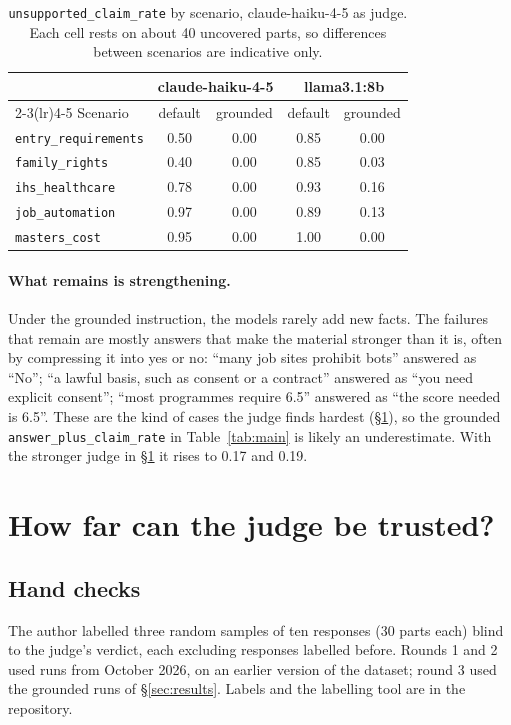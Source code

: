 \documentclass[11pt]{article}
\begin{document}
\begin{table}[t]
\centering\small
\begin{tabular}{lcccc}
\toprule
 & \multicolumn{2}{c}{claude-haiku-4-5} & \multicolumn{2}{c}{llama3.1:8b} \\
\cmidrule(lr){2-3}\cmidrule(lr){4-5}
Scenario & default & grounded & default & grounded \\
\midrule
\texttt{entry\_requirements} & 0.50 & 0.00 & 0.85 & 0.00 \\
\texttt{family\_rights} & 0.40 & 0.00 & 0.85 & 0.03 \\
\texttt{ihs\_healthcare} & 0.78 & 0.00 & 0.93 & 0.16 \\
\texttt{job\_automation} & 0.97 & 0.00 & 0.89 & 0.13 \\
\texttt{masters\_cost} & 0.95 & 0.00 & 1.00 & 0.00 \\
\bottomrule
\end{tabular}
\caption{\texttt{unsupported\_claim\_rate} by scenario, claude-haiku-4-5 as judge. Each cell rests on about 40 uncovered parts, so differences between scenarios are indicative only.}
\label{tab:scenario}
\end{table}

\paragraph{What remains is strengthening.} Under the grounded instruction, the models rarely add new facts. The failures that remain are mostly answers that make the material stronger than it is, often by compressing it into yes or no: ``many job sites prohibit bots'' answered as ``No''; ``a lawful basis, such as consent or a contract'' answered as ``you need explicit consent''; ``most programmes require 6.5'' answered as ``the score needed is 6.5''. These are the kind of cases the judge finds hardest (\S\ref{sec:judge}), so the grounded \texttt{answer\_plus\_claim\_rate} in Table~\ref{tab:main} is likely an underestimate. With the stronger judge in \S\ref{sec:judge} it rises to 0.17 and 0.19.

\section{How far can the judge be trusted?}\label{sec:judge}

\subsection{Hand checks}
The author labelled three random samples of ten responses (30 parts each) blind to the judge's verdict, each excluding responses labelled before. Rounds 1 and 2 used runs from October 2026, on an earlier version of the dataset; round 3 used the grounded runs of \S\ref{sec:results}. Labels and the labelling tool are in the repository.
\end{document}
